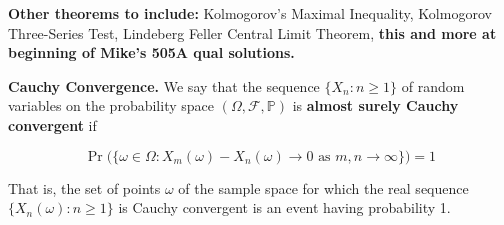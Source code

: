 \textbf{Other theorems to include:} Kolmogorov's Maximal Inequality, Kolmogorov Three-Series Test, Lindeberg Feller Central Limit Theorem, \textbf{this and more at beginning of Mike's 505A qual solutions.}

\begin{definition} \textbf{Cauchy Convergence.} We say that the sequence \(\{X_n: n \geq 1\}\) of random variables on the probability space \((\Omega, \mathcal{F}, \mathbb{P})\) is \textbf{almost surely Cauchy convergent} if

\[
\Pr \big( \{\omega \in \Omega: X_m(\omega) - X_n(\omega) \to 0 \text{ as } m, n \to \infty \} \big) = 1
\]

That is, the set of points \(\omega\) of the sample space for which the real sequence \(\{X_n(\omega): n \geq 1\}\) is Cauchy convergent is an event having probability 1.
\end{definition}


